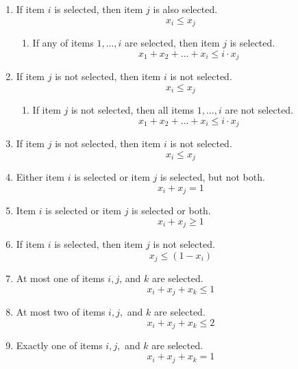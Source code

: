 \begin{enumerate}
 \item If item $i$ is selected, then item $j$ is also selected.
 \begin{equation}
 x_i \leq x_j
 \end{equation}
 \begin{enumerate}
 \item If any of items $1, \dots, i$ are selected, then item $j$ is selected.
 \begin{equation}
 x_1 + x_2 + \dots + x_i \leq i \cdot x_j
 \end{equation}
 \end{enumerate}
 \item If item $j$ is not selected, then item $i$ is not selected.
 \begin{equation}
x_i \leq x_j
 \end{equation}
  \begin{enumerate}
 \item If item $j$ is not selected, then all items $1, \dots, i$ are not selected.
 \begin{equation}
 x_1 + x_2 + \dots + x_i \leq i \cdot x_j
 \end{equation}
 \end{enumerate}
  \item If item $j$ is not selected, then item $i$ is not selected.
 \begin{equation}
x_i \leq x_j
 \end{equation}
\item Either item $i$ is selected or item $j$ is selected, but not both.
 \begin{equation}
 x_i + x_j = 1
 \end{equation}
\item Item $i$ is selected or item $j$ is selected or both.
 \begin{equation}
 x_i + x_j \geq 1
 \end{equation}
\item If item $i$ is selected, then item $j$ is not selected.
 \begin{equation}
x_j \leq (1-x_i)
 \end{equation}

\item At most one of items $i ,j$, and $k$ are selected.
 \begin{equation}
 x_i + x_j + x_k \leq 1
 \end{equation}
\item At most two of items $i,j,$ and $k$ are selected.
 \begin{equation}
 x_i + x_j + x_k \leq 2
 \end{equation}
\item Exactly one of items $i,j,$ and $k$ are selected.
 \begin{equation}
  x_i + x_j + x_k = 1
 \end{equation}
\end{enumerate}

